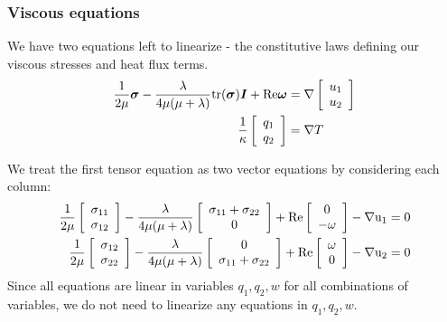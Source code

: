 
\subsubsection{Viscous equations}
We have two equations left to linearize - the constitutive laws defining our viscous stresses and heat flux terms. 
\begin{align*}
\frac{1}{2\mu}{\boldsymbol \sigma}- \frac{\lambda}{4\mu(\mu+\lambda)}{\rm tr}({\boldsymbol \sigma}){\boldsymbol I} + \Reyn {\boldsymbol \omega} &= 
\grad
\left[\begin{array}{c}
u_1\\
u_2
\end{array}
\right]\\
\frac{1}{\kappa}
\left[\begin{array}{c}
q_1\\
q_2
\end{array}\right] &=
\grad T
\end{align*}

We treat the first tensor equation as two vector equations by considering each column:
\begin{align*}
\frac{1}{2\mu} \vecttwo{\sigma_{11}}{\sigma_{12}} - \frac{\lambda}{4\mu(\mu+\lambda)}\vecttwo{\sigma_{11}+\sigma_{22}}{0} + \Reyn\vecttwo{0}{-\omega} - \grad u_1&= 0 \\
\frac{1}{2\mu} \vecttwo{\sigma_{12}}{\sigma_{22}} - \frac{\lambda}{4\mu(\mu+\lambda)}\vecttwo{0}{\sigma_{11}+\sigma_{22}} + \Reyn\vecttwo{\omega}{0} - \grad u_2 &= 0
\end{align*}
Since all equations are linear in variables $q_1, q_2, w$ for all combinations of variables, we do not need to linearize any equations in $q_1, q_2, w$. 

